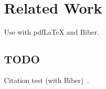 
\chapter{Related Work}\label{chapter:related_work}
Use with pdfLaTeX and Biber.

\section{TODO}
Citation test (with Biber)~\parencite{latex}.








